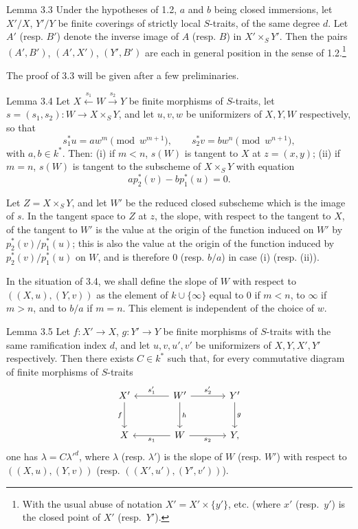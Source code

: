 \begin{statement}{Lemma 3.3}
Under the hypotheses of 1.2, $a$ and $b$ being closed immersions, let $X'/X$, $Y'/Y$ be finite coverings of strictly local $S$-traits, of the same degree $d$. Let $A'$ (resp. $B'$) denote the inverse image of $A$ (resp. $B$) in $X'\times_S Y'$. Then the pairs $(A',B')$, $(A',X')$, $(Y',B')$ are each in general position in the sense of 1.2.\footnote{With the usual abuse of notation $X'=X'\times\{y'\}$, etc. (where $x'$ (resp.\ $y'$) is the closed point of $X'$ (resp.\ $Y'$).}
\end{statement}

The proof of 3.3 will be given after a few preliminaries.

\begin{statement}{Lemma 3.4}
Let $X\xleftarrow{s_1}W\xrightarrow{s_2}Y$ be finite morphisms of $S$-traits, let $s=(s_1,s_2):W\to X\times_SY$, and let $u,v,w$ be uniformizers of $X,Y,W$ respectively, so that
\[
s_1^*u=aw^m\pmod {w^{m+1}},\qquad
s_2^*v=bw^n\pmod {w^{n+1}},
\]
with $a,b\in k^*$. Then: (i) if $m<n$, $s(W)$ is tangent to $X$ at $z=(x,y)$; (ii) if $m=n$, $s(W)$ is tangent to the subscheme of $X\times_SY$ with equation
\[
ap_2^*(v)-bp_1^*(u)=0.
\]
\end{statement}

Let $Z=X\times_SY$, and let $W'$ be the reduced closed subscheme which is the image of $s$. In the tangent space to $Z$ at $z$, the slope, with respect to the tangent to $X$, of the tangent to $W'$ is the value at the origin of the function induced on $W'$ by $p_2^*(v)/p_1^*(u)$; this is also the value at the origin of the function induced by $p_2^*(v)/p_1^*(u)$ on $W$, and is therefore $0$ (resp. $b/a$) in case (i) (resp. (ii)).

In the situation of 3.4, we shall define the slope of $W$ with respect to $((X,u),(Y,v))$ as the element of $k\cup\{\infty\}$ equal to $0$ if $m<n$, to $\infty$ if $m>n$, and to $b/a$ if $m=n$. This element is independent of the choice of $w$.

\begin{statement}{Lemma 3.5}
Let $f:X'\to X$, $g:Y'\to Y$ be finite morphisms of $S$-traits with the same ramification index $d$, and let $u,v,u',v'$ be uniformizers of $X,Y,X',Y'$ respectively. Then there exists $C\in k^*$ such that, for every commutative diagram of finite morphisms of $S$-traits
\[
\begin{tikzcd}[column sep=large,row sep=large]
X' \arrow[d,"f"'] & W' \arrow[l,"s'_1"'] \arrow[r,"s'_2"] \arrow[d,"h"] & Y' \arrow[d,"g"]\\
X & W \arrow[l,"s_1"] \arrow[r,"s_2"'] & Y ,
\end{tikzcd}
\]
one has $\lambda=C{\lambda'}^d$, where $\lambda$ (resp. $\lambda'$) is the slope of $W$ (resp. $W'$) with respect to $((X,u),(Y,v))$ (resp. $((X',u'),(Y',v'))$).
\end{statement}

